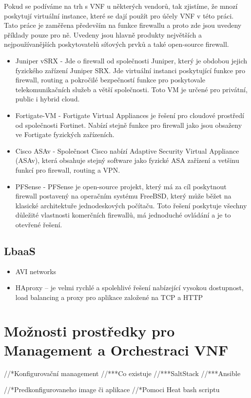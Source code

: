 Pokud se podíváme na trh s VNF u některých vendorů, tak zjistíme, že mnozí poskytují virtuální instance, které se dají použít pro účely VNF v této práci. Tato práce je zaměřena především na funkce firewallu a proto zde jsou uvedeny příklady pouze pro ně. Uvedeny jsou hlavně produkty největších a nejpoužívanějších poskytovatelů síťových prvků a také open-source firewall.

\begin{itemize}
\item Juniper vSRX - Jde o firewall od společnosti Juniper, který je obdobou jejich fyzického zařízení Juniper SRX. Jde virtuální instanci poskytující funkce pro firewall, routing a pokročilé bezpečností funkce pro poskytovale telekomunikačních služeb a větší společnosti. Toto VM je určené pro privátní, public i hybrid cloud. 
\item Fortigate-VM - Fortigate Virtual Appliances je řešení pro cloudové prostředí od společnosti Fortinet. Nabízí stejně funkce pro firewall jako jsou obsaženy ve Fortigate fyzických zařízeních.
\item Cisco ASAv - Společnost Cisco nabízí Adaptive Security Virtual Appliance (ASAv), která obsahuje stejný software jako fyzické ASA zařízení a vetšinu funkcí pro firewall, routing a VPN. 
\item PFSense - PFSense je open-source projekt, který má za cíl poskytnout firewall postavený na operačním systému FreeBSD, který může běžet na klasické architektuře jednodeskových počítaču. Toto řešení poskytuje všechny důležité vlastnosti komerčních firewallů, má jednoduché ovládání a je to otevřené řešení.
\end{itemize} 

\subsection{LbaaS}

\begin{itemize}
\item AVI networks 
\item HAproxy – je velmi rychlé a spolehlivé řešení nabízející vysokou dostupnost, load balancing a proxy pro aplikace založené na TCP a HTTP
\end{itemize}

\section{Možnosti prostředky pro Management a Orchestraci VNF}

//*Konfigurovační management
//***Co existuje
//***SaltStack
//***Ansible

//*Predkonfigurovaneho image či aplikace
//*Pomoci Heat bash scriptu





